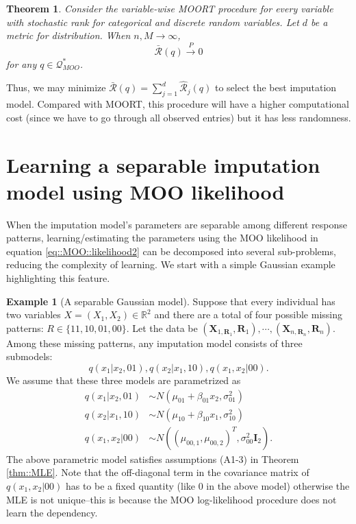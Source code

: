 \documentclass[aos, preprint]{imsart}
\theoremstyle{plain}
\newtheorem{theorem}{Theorem}[section]
\theoremstyle{definition}
\newtheorem*{example}{Example}
\let\hat\widehat
\newcommand{\R}{\mbox{$\mathbb{R}$}}
\newcommand{\bX}{\mathbf{X}}
\newcommand{\bR}{\mathbf{R}}
\begin{document}
\begin{appendix}
\begin{theorem}
\label{thm::MOORT::v}
Consider the variable-wise MOORT procedure for every variable with stochastic rank for categorical and discrete random variables.
Let $d$ be a metric for distribution. 
When $n,M\rightarrow\infty$, 
$$
\bar{\mathcal{R}}(q) \overset{P}{\rightarrow} 0
$$
for any $q \in \mathcal{Q}^*_{MOO}$.
\end{theorem}


Thus, 
we may minimize $\bar{\mathcal{R}}(q) = \sum_{j=1}^d \hat{\mathcal{R}}_j(q)$ to select the best imputation model. 
Compared with MOORT, 
this procedure will  have a higher computational cost (since we have to go through all observed entries)
but it has less randomness.




\section{Learning a separable imputation model using MOO likelihood}	\label{sec::sep}

When the imputation model's parameters are separable among different response patterns, 
learning/estimating the parameters using the MOO likelihood in equation \eqref{eq::MOO::likelihood2} can be decomposed into
several sub-problems, reducing the complexity of learning.
We start with a simple Gaussian example highlighting this feature.

\begin{example}[A separable Gaussian model]	\label{ex::sep}
Suppose that every individual has two variables $X = (X_1,X_2) \in \R^2$
and there are a total of four possible missing patterns: $R \in \{11, 10, 01, 00\}$.
Let the data be $(\bX_{1, \bR_1},\bR_1),\cdots, (\bX_{n, \bR_n}, \bR_n)$.
Among these missing patterns, any imputation model consists of three submodels:
$$q(x_1|x_2, 01), q(x_2|x_1, 10), q(x_1,x_2|00).
$$
We assume that these three models are parametrized as 
\begin{align*}
q(x_1|x_2, 01) &\sim N(\mu_{01} + \beta_{01} x_2, \sigma^2_{01})\\
q(x_2|x_1, 10) &\sim N(\mu_{10} + \beta_{10} x_1, \sigma^2_{10})\\
q(x_1,x_2| 00) &\sim N((\mu_{00,1}, \mu_{00,2})^T, \sigma^2_{00} \mathbf{I}_2).
\end{align*}
The above parametric model satisfies assumptions (A1-3) in Theorem \ref{thm::MLE}. 
Note that the off-diagonal term in the covariance matrix of $q(x_1,x_2| 00) $ has to 
be a fixed quantity (like $0$ in the above model) otherwise 
the MLE is not unique--this is because the MOO log-likelihood procedure does not learn
the dependency.


\end{example}
\end{appendix}
\end{document}
